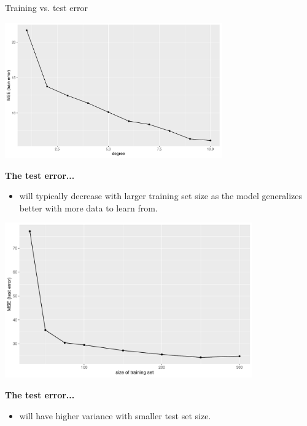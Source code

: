 \documentclass[11pt,compress,t,notes=noshow, xcolor=table]{beamer}
\begin{document}
\begin{vbframe}{Training vs. test error}
\begin{center}
\includegraphics[width=0.7\textwidth]{figure/fig-train-vs-test-error-4}
\end{center}

\framebreak

\textbf{The test error...}

\begin{itemize}
  \item will typically decrease with larger training set size as the model 
  generalizes better with more data to learn from.
  
\end{itemize}
\begin{center}
\includegraphics[width=0.8\textwidth]{figure/fig-train-vs-test-error-2}
\end{center} 

\framebreak
\textbf{The test error...}

\begin{itemize}  
  
  \item will have higher variance with smaller test set size.


\end{itemize}
\end{vbframe}
\end{document}
